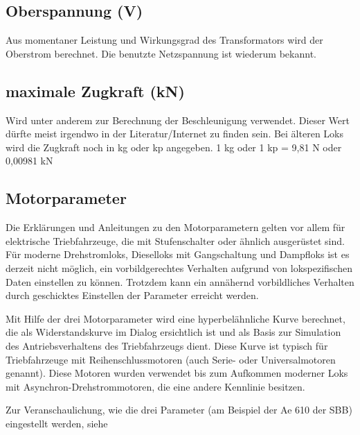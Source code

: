 \subsection{Oberspannung (V)}
Aus momentaner Leistung und Wirkungsgrad des Transformators wird der Oberstrom berechnet.
Die benutzte Netzspannung ist wiederum bekannt.

\subsection{maximale Zugkraft (kN)}
Wird unter anderem zur Berechnung der Beschleunigung verwendet.
Dieser Wert dürfte meist irgendwo in der Literatur/Internet zu finden sein.
Bei älteren Loks wird die Zugkraft noch in kg oder kp angegeben. 1 kg oder 1 kp = 9,81 N  oder 0,00981 kN


\subsection{Motorparameter}
Die Erklärungen und Anleitungen zu den Motorparametern gelten vor allem für elektrische Triebfahrzeuge, die mit Stufenschalter oder ähnlich ausgerüstet sind. Für moderne Drehstromloks, Dieselloks mit Gangschaltung und Dampfloks  ist es derzeit nicht möglich, ein vorbildgerechtes Verhalten aufgrund von lokspezifischen Daten einstellen zu können. Trotzdem kann ein annähernd vorbildliches Verhalten durch geschicktes Einstellen der Parameter erreicht werden.

Mit Hilfe der drei Motorparameter wird eine hyperbelähnliche Kurve berechnet, die als Widerstandskurve im Dialog ersichtlich ist und als Basis zur Simulation des Antriebsverhaltens des Triebfahrzeugs dient. Diese Kurve ist typisch für Triebfahrzeuge mit Reihenschlussmotoren (auch Serie- oder Universalmotoren genannt). Diese Motoren wurden verwendet bis zum Aufkommen moderner Loks mit Asynchron-Drehstrommotoren, die eine andere Kennlinie besitzen.

Zur Veranschaulichung, wie die drei Parameter (am Beispiel der Ae 610 der SBB) eingestellt werden, siehe 

